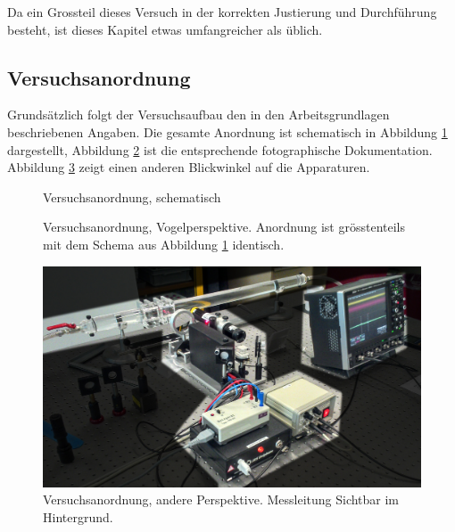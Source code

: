 Da ein Grossteil dieses Versuch in der korrekten Justierung und Durchf\"uhrung
besteht, ist dieses Kapitel etwas umfangreicher als \"ublich.

\subsection{Versuchsanordnung}
\label{subsec:versuchsanordnung}

Grunds\"atzlich  folgt   der  Versuchsaufbau  den  in   den  Arbeitsgrundlagen
beschriebenen    Angaben. Die   gesamte    Anordnung   ist    schematisch   in
Abbildung     \ref{fig:versuchsanordnung:schema}    dargestellt,     Abbildung
\ref{fig:versuchsanordnung:birdseye}  ist   die  entsprechende  fotographische
Dokumentation.  Abbildung  \ref{fig:versuchsanordnung:perspective} zeigt einen
anderen Blickwinkel auf die Apparaturen.


\begin{figure}[h!t]
    \centering
    \resizebox{\textwidth}{!}{}
    \caption{%
        Versuchsanordnung, schematisch
    }
    \label{fig:versuchsanordnung:schema}
\end{figure}

\begin{figure}[h!t]
    \centering
    \resizebox{.67\textwidth}{!}{}
    \caption{%
        Versuchsanordnung, Vogelperspektive. Anordnung ist gr\"osstenteils mit
        dem Schema aus Abbildung \ref{fig:versuchsanordnung:schema} identisch.
    }
    \label{fig:versuchsanordnung:birdseye}
\end{figure}

\begin{figure}[h!t]
    \centering
    \includegraphics[width=.67\textwidth]{images/versuchsanordnung2.jpeg}
    \caption{%
        Versuchsanordnung,   andere   Perspektive. Messleitung   Sichtbar   im
        Hintergrund.
    }
    \label{fig:versuchsanordnung:perspective}
\end{figure}

